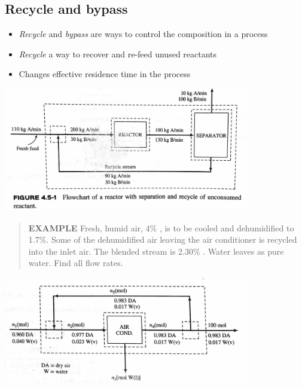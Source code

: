\documentclass[11pt]{article}
\begin{document}
\subsection{Recycle and bypass}
\label{sec-5-5}
\begin{itemize}
\item \emph{Recycle} and \emph{bypass} are ways to control the composition in a process
\item \emph{Recycle} a way to recover and re-feed unused reactants
\item Changes effective residence time in the process
\end{itemize}

\includegraphics[width=0.8\textwidth]{./figs/Recycle1.png}

\begin{quote}
\textbf{EXAMPLE} Fresh, humid air, 4\% , is to be cooled and dehumidified to 1.7\%.  Some of the dehumidified air leaving the air conditioner is recycled into the inlet air.  The blended stream is 2.30\% .  Water leaves as pure water.  Find all flow rates.
\end{quote}

\includegraphics[width=0.8\textwidth]{./figs/Recycle2.png}
\end{document}
